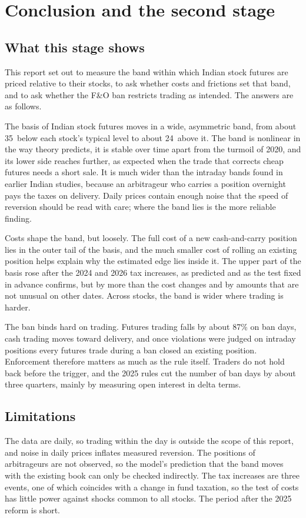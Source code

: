 \section{Conclusion and the second stage}\label{sec:conclusion}

\subsection{What this stage shows}
This report set out to measure the band within which Indian stock futures are priced relative to their stocks, to ask
whether costs and frictions set that band, and to ask whether the F\&O ban restricts trading as intended. The answers
are as follows.

The basis of Indian stock futures moves in a wide, asymmetric band, from about 35\bp\ below each stock's typical level
to about 24\bp\ above it. The band is nonlinear in the way theory predicts, it is stable over time apart from the turmoil
of 2020, and its lower side reaches further, as expected when the trade that corrects cheap futures needs a short sale.
It is much wider than the intraday bands found in earlier Indian studies, because an arbitrageur who carries a position
overnight pays the taxes on delivery. Daily prices contain enough noise that the speed of reversion should be read with
care; where the band lies is the more reliable finding.

Costs shape the band, but loosely. The full cost of a new cash-and-carry position lies in the outer tail of the basis,
and the much smaller cost of rolling an existing position helps explain why the estimated edge lies inside it. The upper
part of the basis rose after the 2024 and 2026 tax increases, as predicted and as the test fixed in advance confirms, but
by more than the cost changes and by amounts that are not unusual on other dates. Across stocks, the band is wider where
trading is harder.

The ban binds hard on trading. Futures trading falls by about 87\% on ban days, cash trading moves toward delivery, and
once violations were judged on intraday positions every futures trade during a ban closed an existing position.
Enforcement therefore matters as much as the rule itself. Traders do not hold back before the trigger, and the 2025
rules cut the number of ban days by about three quarters, mainly by measuring open interest in delta terms.

\subsection{Limitations}
The data are daily, so trading within the day is outside the scope of this report, and noise in daily prices inflates
measured reversion. The positions of arbitrageurs are not observed, so the model's prediction that the band moves with
the existing book can only be checked indirectly. The tax increases are three events, one of which coincides with a
change in fund taxation, so the test of costs has little power against shocks common to all stocks. The period after the
2025 reform is short.

